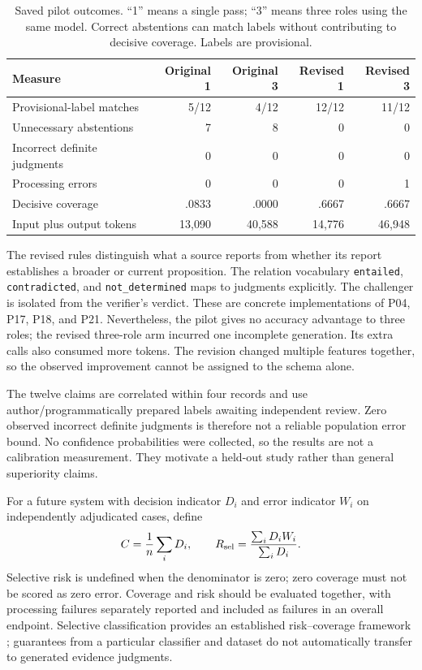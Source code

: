 \begin{table}[htbp]
\centering\small
\begin{tabular}{@{}lrrrr@{}}
\toprule
Measure & Original 1 & Original 3 & Revised 1 & Revised 3\\\midrule
Provisional-label matches & 5/12 & 4/12 & 12/12 & 11/12\\
Unnecessary abstentions & 7 & 8 & 0 & 0\\
Incorrect definite judgments & 0 & 0 & 0 & 0\\
Processing errors & 0 & 0 & 0 & 1\\
Decisive coverage & .0833 & .0000 & .6667 & .6667\\
Input plus output tokens & 13,090 & 40,588 & 14,776 & 46,948\\\bottomrule
\end{tabular}
\caption{Saved pilot outcomes. ``1'' means a single pass; ``3'' means three roles using the same model. Correct abstentions can match labels without contributing to decisive coverage. Labels are provisional.}
\label{tab:pilot}
\end{table}

The revised rules distinguish what a source reports from whether its report establishes a broader or current proposition. The relation vocabulary \texttt{entailed}, \texttt{contradicted}, and \texttt{not\_determined} maps to judgments explicitly. The challenger is isolated from the verifier's verdict. These are concrete implementations of P04, P17, P18, and P21. Nevertheless, the pilot gives no accuracy advantage to three roles; the revised three-role arm incurred one incomplete generation. Its extra calls also consumed more tokens. The revision changed multiple features together, so the observed improvement cannot be assigned to the schema alone.

The twelve claims are correlated within four records and use author/programmatically prepared labels awaiting independent review. Zero observed incorrect definite judgments is therefore not a reliable population error bound. No confidence probabilities were collected, so the results are not a calibration measurement. They motivate a held-out study rather than general superiority claims.

For a future system with decision indicator $D_i$ and error indicator $W_i$ on independently adjudicated cases, define
\begin{equation}
 C=\frac{1}{n}\sum_i D_i,\qquad
 R_{\rm sel}=\frac{\sum_i D_iW_i}{\sum_iD_i}.
\end{equation}
Selective risk is undefined when the denominator is zero; zero coverage must not be scored as zero error. Coverage and risk should be evaluated together, with processing failures separately reported and included as failures in an overall endpoint. Selective classification provides an established risk--coverage framework \cite{geifman}; guarantees from a particular classifier and dataset do not automatically transfer to generated evidence judgments.

